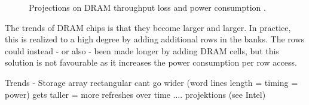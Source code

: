 \begin{figure}[t]
    \centering
    \caption{Projections on DRAM throughput loss and power consumption \cite{raidr}.}
    \label{fig:dram_data_proj}
\end{figure}

The trends of DRAM chips is that they become larger and larger. In practice, this is realized to a high degree by adding additional rows in the banks. The rows could instead - or also - been made longer by adding DRAM cells, but this solution is not favourable as it increases the power consumption per row access.

Trends - Storage array rectangular
            cant go wider (word lines length = timing = power)
            gets taller = more refreshes
            over time .... projektions (see Intel)
